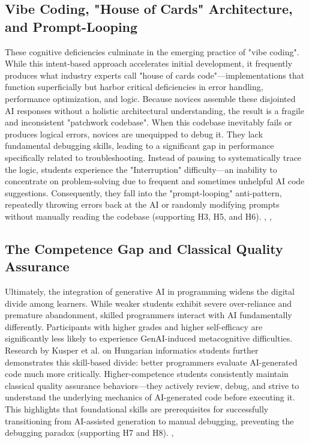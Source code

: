 \documentclass[../tanulmany.tex]{subfiles}
\begin{document}
\subsection{Vibe Coding, "House of Cards" Architecture, and Prompt-Looping}
These cognitive deficiencies culminate in the emerging practice of "vibe coding". While this intent-based approach accelerates initial development, it frequently produces what industry experts call "house of cards code"—implementations that function superficially but harbor critical deficiencies in error handling, performance optimization, and logic.
Because novices assemble these disjointed AI responses without a holistic architectural understanding, the result is a fragile and inconsistent "patchwork codebase".
When this codebase inevitably fails or produces logical errors, novices are unequipped to debug it. They lack fundamental debugging skills, leading to a significant gap in performance specifically related to troubleshooting.
Instead of pausing to systematically trace the logic, students experience the "Interruption" difficulty—an inability to concentrate on problem-solving due to frequent and sometimes unhelpful AI code suggestions.
Consequently, they fall into the "prompt-looping" anti-pattern, repeatedly throwing errors back at the AI or randomly modifying prompts without manually reading the codebase (supporting H3, H5, and H6).
\cite{maes2025gotchas}, \cite{shen2026how}, \cite{prather2024widening}

\subsection{The Competence Gap and Classical Quality Assurance}
Ultimately, the integration of generative AI in programming widens the digital divide among learners.
While weaker students exhibit severe over-reliance and premature abandonment, skilled programmers interact with AI fundamentally differently. Participants with higher grades and higher self-efficacy are significantly less likely to experience GenAI-induced metacognitive difficulties.
Research by Kusper et al. on Hungarian informatics students further demonstrates this skill-based divide: better programmers evaluate AI-generated code much more critically.
Higher-competence students consistently maintain classical quality assurance behaviors—they actively review, debug, and strive to understand the underlying mechanics of AI-generated code before executing it.
This highlights that foundational skills are prerequisites for successfully transitioning from AI-assisted generation to manual debugging, preventing the debugging paradox (supporting H7 and H8).
\cite{prather2024widening}, \cite{kusper2025we}
\end{document}
